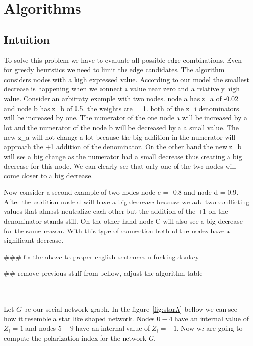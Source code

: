 \chapter{Algorithms}
\label{ch:algorithms}



\section{Intuition}
\label{sec:intuition}

To solve this problem we have to evaluate all possible edge combinations. Even for greedy heuristics we need to limit the edge candidates. The algorithm considers nodes with a high expressed value. According to our model the smallest decrease is happening when we connect a value near zero and a relatively high value. Consider an arbitraty example with two nodes. node a has z_a of -0.02 and node b has z_b of 0.5. the weights are = 1. both of the z_i denominators will be increased by one. The numerator of the one node a will be increased by a lot and the numerator of the node b will be decreased by a a small value. The new z_a will not change a lot because the big addition in the numerator will approach the +1 addition of the denominator. On the other hand the new z_b will see a big change as the numerator had a small decrease thus creating a big decrease for this node. We can clearly see that only one of the two nodes will come closer to a big decrease. 

Now consider a second example of two nodes node c = -0.8 and node d = 0.9. After the addition node d will have a big decrease because we add two conflicting values that almost neutralize each other but the addition of the +1 on the denominator stands still. On the other hand node C will also see a big decrease for the same reason. With this type of connection both of the nodes have a significant decrease.


### fix the above to proper english sentences u fucking donkey


## remove previous stuff from bellow, adjust the algorithm table


\\
\\
Let $G$ be our social network graph. In the figure~\ref{fig:starA} bellow we can see how it resemble a star like shaped network. Nodes $0-4$ have an internal value of $Z_i = 1$ and nodes $5-9$ have an internal value of $Z_i=-1$. Now we are going to compute the polarization index for the network $G$. 
\\



